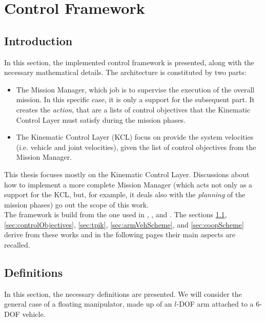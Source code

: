

\chapter{Control Framework}
\label{chap:control}
\ifpdf
    \graphicspath{{ControlFramework/Figures/PNG/}{ControlFramework/Figures/PDF/}{ControlFramework/Figures/}}
\else
    \graphicspath{{ControlFramework/Figures/EPS/}{ControlFramework/Figures/}}
\fi

\section*{Introduction}
In this section, the implemented control framework is presented, along with the necessary mathematical details. The architecture is constituted by two parts:
\begin{itemize}
	\item The Mission Manager, which job is to supervise the execution of the overall mission. In this specific case, it is only a support for the subsequent part. It creates the \textit{action}, that are a lists of control objectives that the Kinematic Control Layer must satisfy during the mission phases. 
	\item The Kinematic Control Layer (KCL) focus on provide the system velocities (i.e. vehicle and joint velocities), given the list of control objectives from the Mission Manager.
\end{itemize}
This thesis focuses mostly on the Kinematic Control Layer. Discussions about how to implement a more complete Mission Manager (which acts not only as a support for the KCL, but, for example, it deals also with the \textit{planning} of the mission phases) go out the scope of this work.\\

The framework is build from the one used in \cite{IntroMaris2}, \cite{tesiWander}, and \cite{IntroRecent}. The sections \ref{sec:definitions}, \ref{sec:controlObjectives}, \ref{sec:tpik}, \ref{sec:armVehScheme}, and \ref{sec:coopScheme} derive from these works and in the following pages their main aspects are recalled.

\section{Definitions}
\label{sec:definitions}
In this section, the necessary definitions are presented. We will consider the general case of a floating manipulator, made up of an $l$-DOF arm attached to a 6-DOF vehicle.\\

